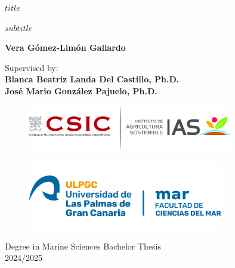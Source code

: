 %
%
%
% 


\begin{center}
    \Huge
    \textbf{$title$}
        
    \vspace{0.5cm}
    \LARGE
    \textit{$subtitle$}
        
    \vspace{0.5cm}
    \textbf{Vera Gómez-Limón Gallardo}
        
    \vspace{0.5cm}
    \Large
    Supervised by:\\
    \textbf{Blanca Beatriz Landa Del Castillo, Ph.D.\\José Mario González Pajuelo, Ph.D.}
        
    \vspace{0.5cm}
    \begin{figure}[h]
      \centering
      \includegraphics[height=2cm]{images/logo-ias-csic.jpg}
    \end{figure}
    
    \begin{figure}[h]
      \centering
      \includegraphics[height=3cm]{images/logo-ulpgc.png}
    \end{figure}
    
    Degree in Marine Sciences Bachelor Thesis\\2024/2025
        
\end{center}
	
	